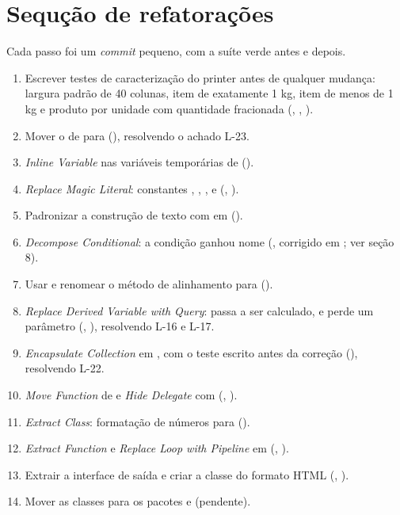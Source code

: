 \section{Sequ\c{c}\~ao de refatora\c{c}\~oes}
Cada passo foi um \textit{commit} pequeno, com a su\'ite verde antes e depois.
\begin{enumerate}
\item Escrever testes de caracteriza\c{c}\~ao do printer antes de qualquer mudan\c{c}a: largura padr\~ao de 40 colunas, item de exatamente 1 kg, item de menos de 1 kg e produto por unidade com quantidade fracionada (, , ).
\item Mover o  de  para  (), resolvendo o achado L-23.
\item \textit{Inline Variable} nas vari\'aveis tempor\'arias de  ().
\item \textit{Replace Magic Literal}: constantes , , ,  e  (, ).
\item Padronizar a constru\c{c}\~ao de texto com  em  ().
\item \textit{Decompose Conditional}: a condi\c{c}\~ao  ganhou nome (, corrigido em ; ver se\c{c}\~ao 8).
\item Usar  e renomear o m\'etodo de alinhamento para  ().
\item \textit{Replace Derived Variable with Query}:  passa a ser calculado, e  perde um par\^ametro (, ), resolvendo L-16 e L-17.
\item \textit{Encapsulate Collection} em , com o teste escrito antes da corre\c{c}\~ao (), resolvendo L-22.
\item \textit{Move Function} de  e \textit{Hide Delegate} com  (, ).
\item \textit{Extract Class}: formata\c{c}\~ao de n\'umeros para  ().
\item \textit{Extract Function} e \textit{Replace Loop with Pipeline} em  (, ).
\item Extrair a interface de sa\'ida e criar a classe do formato HTML (, ).
\item Mover as classes para os pacotes  e  (pendente).
\end{enumerate}

